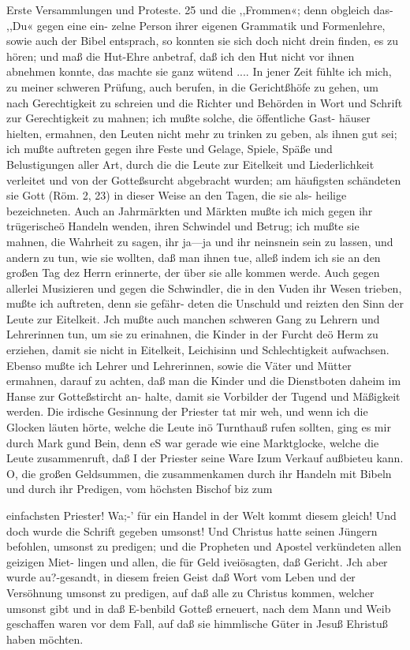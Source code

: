 Erste Versammlungen und Proteste. 25
und die ,,Frommen«; denn obgleich das- ,,Du« gegen eine ein-
zelne Person ihrer eigenen Grammatik und Formenlehre, sowie
auch der Bibel entsprach, so konnten sie sich doch nicht drein
finden, es zu hören; und maß die Hut-Ehre anbetraf, daß ich
den Hut nicht vor ihnen abnehmen konnte, das machte sie ganz
wütend ....
In jener Zeit fühlte ich mich, zu meiner schweren Prüfung,
auch berufen, in die Gerichtßhöfe zu gehen, um nach Gerechtigkeit
zu schreien und die Richter und Behörden in Wort und Schrift
zur Gerechtigkeit zu mahnen; ich mußte solche, die öffentliche Gast-
häuser hielten, ermahnen, den Leuten nicht mehr zu trinken zu
geben, als ihnen gut sei; ich mußte auftreten gegen ihre Feste
und Gelage, Spiele, Späße und Belustigungen aller Art, durch
die die Leute zur Eitelkeit und Liederlichkeit verleitet und von
der Gotteßsurcht abgebracht wurden; am häufigsten schändeten
sie Gott (Röm. 2, 23) in dieser Weise an den Tagen, die sie als-
heilige bezeichneten. Auch an Jahrmärkten und Märkten mußte
ich mich gegen ihr trügerischeö Handeln wenden, ihren Schwindel
und Betrug; ich mußte sie mahnen, die Wahrheit zu sagen, ihr
ja—ja und ihr neinsnein sein zu lassen, und andern zu tun, wie
sie wollten, daß man ihnen tue, alleß indem ich sie an den großen
Tag dez Herrn erinnerte, der über sie alle kommen werde. Auch
gegen allerlei Musizieren und gegen die Schwindler, die in den
Vuden ihr Wesen trieben, mußte ich auftreten, denn sie gefähr-
deten die Unschuld und reizten den Sinn der Leute zur Eitelkeit.
Jch mußte auch manchen schweren Gang zu Lehrern und Lehrerinnen
tun, um sie zu erinahnen, die Kinder in der Furcht deö Herm zu
erziehen, damit sie nicht in Eitelkeit, Leichisinn und Schlechtigkeit
aufwachsen. Ebenso mußte ich Lehrer und Lehrerinnen, sowie die
Väter und Mütter ermahnen, darauf zu achten, daß man die
Kinder und die Dienstboten daheim im Hanse zur Gotteßstircht an-
halte, damit sie Vorbilder der Tugend und Mäßigkeit werden.
Die irdische Gesinnung der Priester tat mir weh, und wenn
ich die Glocken läuten hörte, welche die Leute inö Turnthauß
rufen sollten, ging es mir durch Mark gund Bein, denn eS war
gerade wie eine Marktglocke, welche die Leute zusammenruft, daß I
der Priester seine Ware Izum Verkauf außbieteu kann. O, die
großen Geldsummen, die zusammenkamen durch ihr Handeln mit
Bibeln und durch ihr Predigen, vom höchsten Bischof biz zum


einfachsten Priester! Wa;-’ für ein Handel in der Welt kommt
diesem gleich! Und doch wurde die Schrift gegeben umsonst! Und
Christus hatte seinen Jüngern befohlen, umsonst zu predigen;
und die Propheten und Apostel verkündeten allen geizigen Miet-
lingen und allen, die für Geld iveiösagten, daß Gericht. Jch
aber wurde au?-gesandt, in diesem freien Geist daß Wort vom
Leben und der Versöhnung umsonst zu predigen, auf daß alle zu
Christus kommen, welcher umsonst gibt und in daß E-benbild
Gotteß erneuert, nach dem Mann und Weib geschaffen waren
vor dem Fall, auf daß sie himmlische Güter in Jesuß Ehristuß
haben möchten.